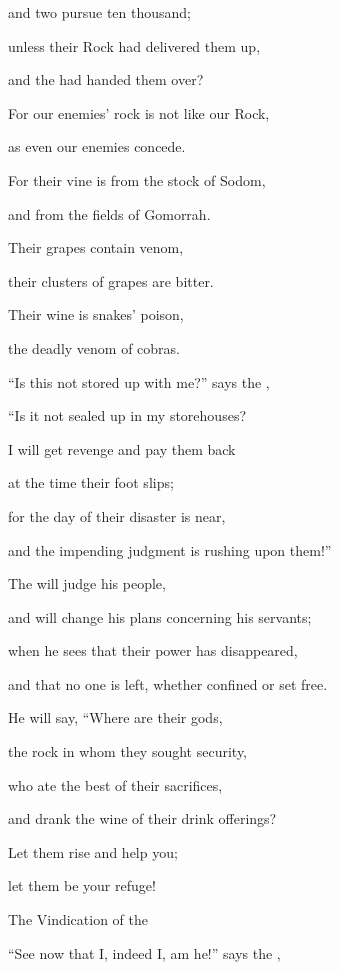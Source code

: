 {\par }{\Q and two
pursue
ten thousand;
\par }{\Q unless
their Rock
had delivered them
up,

\par }{\Q and the
{}
had handed them over?
\par }{\Q {}For
our enemies’ rock
is not
like our Rock,
\par }{\Q as even our enemies
concede.
\par }{\Q {}For
their vine
is from the stock
of Sodom,
\par }{\Q and from the fields of Gomorrah.
\par }{\Q Their grapes
contain venom,
\par }{\Q their clusters
of grapes
are bitter.
\par }{\Q {}Their wine
is snakes’
poison,
\par }{\Q the deadly
venom
of cobras.
\par }{\Q {}“Is this not
stored
up with me?” says the
{},

\par }{\Q “Is it not sealed
up in my storehouses?
\par }{\Q {}I will get revenge
and pay them back
\par }{\Q at the time
their foot
slips;
\par }{\Q for
the day
of their disaster
is near,
\par }{\Q and the impending
judgment is rushing upon them!”
\par }{\Q {}The
{}
will judge
his people,
\par }{\Q and will change
his plans concerning
his servants;
\par }{\Q when
he sees
that
their power
has disappeared,
\par }{\Q and that no one
is left, whether confined
or set free.
\par }{\Q {}He will say,
“Where
are their gods,
\par }{\Q the rock
in whom they sought security,
\par }{\Q {}who
ate
the best
of their sacrifices,
\par }{\Q and drank
the wine
of their drink offerings?
\par }{\Q Let them rise
and help
you;
\par }{\Q let them be
your refuge!
\par }{\SH The Vindication of the
{}
\par }{\Q {}“See
now
that
I,
indeed
I, am
he!” says the
{},

}
